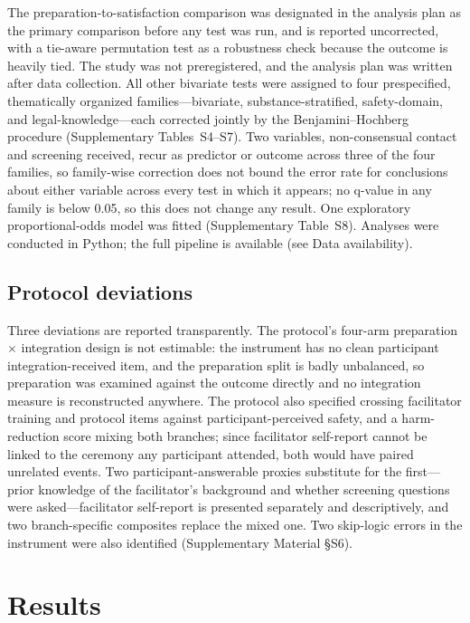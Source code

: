 \documentclass[12pt]{article}
\begin{document}
The preparation-to-satisfaction comparison was designated in the analysis plan as the primary comparison
before any test was run, and is reported uncorrected, with a tie-aware permutation test as a robustness
check because the outcome is heavily tied. The study was not preregistered, and the analysis plan was
written after data collection. All other bivariate tests were assigned to four
prespecified, thematically organized families---bivariate, substance-stratified, safety-domain, and
legal-knowledge---each corrected jointly by the Benjamini--Hochberg procedure (Supplementary
Tables~S4--S7). Two variables, non-consensual contact and screening received, recur as predictor or outcome
across three of the four families, so family-wise correction does not bound the error rate for conclusions
about either variable across every test in which it appears; no q-value in any family is below 0.05, so this
does not change any result. One exploratory proportional-odds model was fitted
(Supplementary Table~S8). Analyses were conducted in Python; the full pipeline is available (see Data
availability).

\subsection{Protocol deviations}

Three deviations are reported transparently. The protocol's four-arm preparation $\times$ integration
design is not estimable: the instrument has no clean participant integration-received item, and the
preparation split is badly unbalanced, so preparation was examined against the outcome directly and no
integration measure is reconstructed anywhere. The protocol also specified crossing facilitator training and
protocol items against participant-perceived safety, and a harm-reduction score mixing both branches; since
facilitator self-report cannot be linked to the ceremony any participant attended, both would have paired
unrelated events. Two participant-answerable proxies substitute for the first---prior knowledge of the
facilitator's background and whether screening questions were asked---facilitator self-report is presented
separately and descriptively, and two branch-specific composites replace the mixed one. Two skip-logic
errors in the instrument were also identified (Supplementary Material \S S6).

\section{Results}
\end{document}
